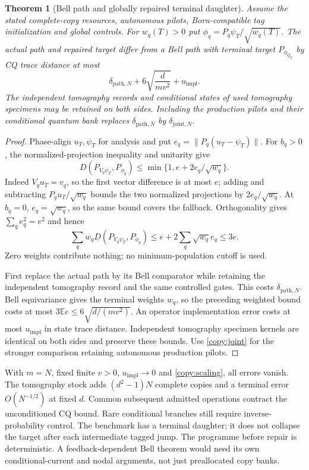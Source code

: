 \documentclass[11pt,oneside,openany]{book}
\newtheorem{theorem}{Theorem}[chapter]
\theoremstyle{definition}
\theoremstyle{remark}\newtheorem{remark}[theorem]{Remark}
\begin{document}
\begin{theorem}[Bell path and globally repaired terminal daughter]
\label{copy:terminal}
Assume the stated complete-copy resources, autonomous pilots,
Born-compatible tag initialization and global controls. For
$w_q(T)>0$ put $\phi_q=P_q\psi_T/\sqrt{w_q(T)}$. The actual path
and repaired target differ from a Bell path with terminal target
$P_{\phi_{Q_T}}$ by CQ trace distance at most
\begin{equation}
 \delta_{\mathrm{path},N}+6\sqrt{\frac d{mv^2}}+
                                               u_{\mathrm{impl}}.         \label{copy:terminal-bound}
\end{equation}
The independent tomography records and conditional states of used
tomography specimens may be retained on both sides. Including the
production pilots and their conditional quantum bank replaces
$\delta_{\mathrm{path},N}$ by $\delta_{\mathrm{joint},N}$.
\end{theorem}
\begin{proof}
Phase-align $u_T,\psi_T$ for analysis and put
$e_q=\|P_q(u_T-\psi_T)\|$. For $b_q>0$, the normalized-projection
inequality and unitarity give
\[
 D(P_{V_q\psi_T},P_{\phi_q})
       \le\min\{1,e+2e_q/\sqrt{w_q}\}.
\]
Indeed $V_qu_T=v_q$, so the first vector difference is at most $e$;
adding and subtracting $P_qu_T/\sqrt{w_q}$ bounds the two normalized
projections by $2e_q/\sqrt{w_q}$. At $b_q=0$, $e_q=\sqrt{w_q}$,
so the same bound covers the fallback. Orthogonality gives
$\sum_qe_q^2=e^2$ and hence
\[
 \sum_qw_q D(P_{V_q\psi_T},P_{\phi_q})
       \le e+2\sum_q\sqrt{w_q}e_q\le3e.
\]
Zero weights contribute nothing; no minimum-population cutoff is used.

First replace the actual path by its Bell comparator while retaining
the independent tomography record and the same controlled gates.
This costs $\delta_{\mathrm{path},N}$. Bell equivariance gives the
terminal weights $w_q$, so the preceding weighted bound costs at most
$3\mathbb E e\le6\sqrt{d/(mv^2)}$. An operator implementation
error costs at most $u_{\mathrm{impl}}$ in state trace distance.
Independent tomography specimen kernels are identical on both sides
and preserve these bounds. Use \eqref{copy:joint} for the stronger
comparison retaining autonomous production pilots.
\end{proof}

With $m=N$, fixed finite $v>0$, $u_{\mathrm{impl}}\to0$ and
\eqref{copy:scaling}, all errors vanish. The tomography stock adds
$(d^2-1)N$ complete copies and a terminal error $O(N^{-1/2})$ at fixed
$d$. Common subsequent admitted operations contract the unconditioned
CQ bound. Rare conditional branches still require inverse-probability
control. The benchmark has a terminal daughter; it does not collapse
the target after each intermediate tagged jump. The programme before
repair is deterministic. A feedback-dependent Bell theorem would need
its own conditional-current and nodal arguments, not just preallocated
copy banks.
\end{document}
